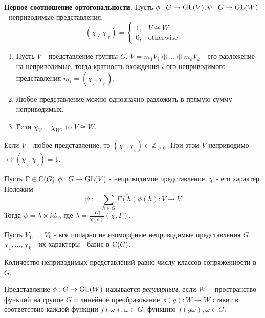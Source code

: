 \begin{thm}
\textbf{Первое соотношение ортогональности.} Пусть $\phi:G\to\operatorname{GL}(V),\psi:G\to\operatorname{GL}(W)$ - неприводимые представления.
\begin{equation*}
(\chi_{_V},\chi_{_W}) = 
 \begin{cases}
   1, & V\cong W\\
   0, &\text{otherwise}
 \end{cases}
\end{equation*}
\end{thm}

\begin{ass}
\begin{enumerate}
  \item Пусть $V$ - представление группы $G$, $V = m_1V_1\oplus\ldots\oplus m_kV_k$ - его разложение на неприводимые, тогда кратность вхождения $i$-ого неприводимого представления $m_i=(\chi_{_V},\chi_{_{V_i}})$.
  \item Любое представление можно однозначно разложить в прямую сумму неприводимых.
  \item Если $\chi_V = \chi_W$, то $V\cong W$.
\end{enumerate}
\end{ass}

\begin{ass}
Если $V$ - любое представление, то $(\chi_{_V},\chi_{_V})\in\mathbb{Z}_{\geq 0}$. При этом $V$ неприводимо $\leftrightarrow (\chi_{_V},\chi_{_V}) = 1$.
\end{ass}

\begin{lemma}
Пусть $\Gamma\in\operatorname{C}(G),\phi:G\to\operatorname{GL}(V)$ - неприводимое представление, $\chi$ - его характер. Положим $$\psi:=\sum_{h\in G}\overline{\Gamma(h)}\phi(h):V\to V$$
Тогда $\psi = \lambda\times id_V$, где $\lambda = \frac{|G|}{\chi(e)}(\chi,\Gamma)$.
\end{lemma}

\begin{thm}
Пусть $V_1,\ldots,V_k$ - все попарно не изоморфные неприводимые представления $G$. $\chi_1,\ldots,\chi_k$ - их характеры - базис в $\operatorname{C}(G)$.
\end{thm}

\begin{ass}
Количество неприводимых представлений равно числу классов сопряженности в $G$.
\end{ass}

\begin{defi}
Представление $\phi:G\to \operatorname{GL}(W)$ называется \textit{регулярным}, если $W$— пространство функций на группе $G$ и линейное преобразование $\phi(g):W\to W$ ставит в соответствие каждой функции $f(\omega), \omega\in G$, функцию $f(g\omega), \omega\in G$.
\end{defi}

